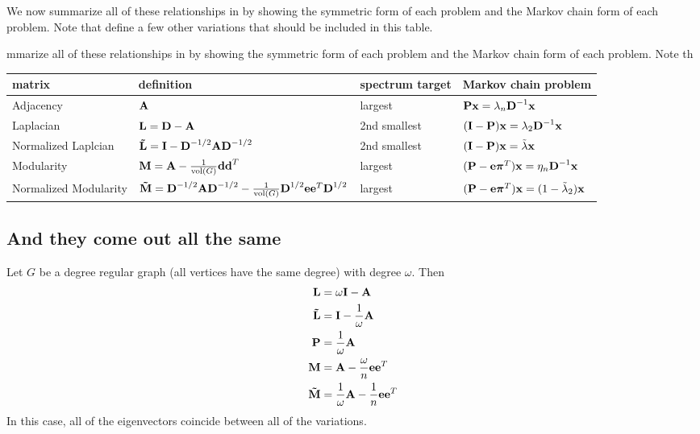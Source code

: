 \documentclass[nofonts]{dgleich-article}
\DeclareMathOperator{\vol}{vol}
\newcommand{\mnL}{\mat{\tilde{L}}}
\newcommand{\mnM}{\mat{\tilde{M}}}
\newcommand{\tlambda}{\tilde{\lambda}}
\newcommand{\meye}{\mI}
\renewcommand{\vpi}{\vec{\pi}}
\begin{document}
We now summarize all of these relationships in by showing the symmetric form
of each problem and the Markov chain form of each problem.  Note that 
\citet{Shi2000-normalized-cuts} define a few other variations that
should be included in this table.  
\begin{fullwidthtable}
\caption{mmarize all of these relationships in by showing the symmetric form
of each problem and the Markov chain form of each problem.  Note th}
 \begin{tabularx}{\linewidth}{XllX}
  \toprule
   matrix & definition & spectrum target & Markov chain problem\\
  \midrule
   Adjacency & $\boldsymbol{\mathrm{A}}$ & largest & $\boldsymbol{\mathrm{P}} \boldsymbol{\mathrm{x}} = \lambda_n \boldsymbol{\mathrm{D}}^{-1} \boldsymbol{\mathrm{x}}$\\[1ex]
   Laplacian & $\boldsymbol{\mathrm{L}} = \boldsymbol{\mathrm{D}} - \boldsymbol{\mathrm{A}}$ & 2nd smallest & $(\boldsymbol{\mathrm{I}} - \boldsymbol{\mathrm{P}}) \boldsymbol{\mathrm{x}} = \lambda_{2} \boldsymbol{\mathrm{D}}^{-1} \boldsymbol{\mathrm{x}}$\\[1ex]
   Normalized Laplcian & $\mnL = \eye - \mD^{-1/2} \mA \mD^{-1/2}$ & 2nd smallest 
     & $(\eye - \mP) \vx = \tlambda \vx$\\[1ex]
   Modularity & $\mM = \mA - \frac{1}{\vol(G)} \vd \vd^T$ & largest 
     & $(\mP - \ve \vpi^T) \vx = \eta_n \mD^{-1} \vx$\\[1ex]
   Normalized Modularity & $\mnM = \mD^{-1/2} \mA \mD^{-1/2} - \frac{1}{\vol(G)} \mD^{1/2} \ve \ve^T \mD^{1/2}$
     & largest & $(\mP - \ve \vpi^T) \vx = (1-\tlambda_2) \vx$\\ 
   \bottomrule
 \end{tabularx}
\end{fullwidthtable}


\subsection{And they come out all the same}

Let $G$ be a degree regular graph (all vertices have
the same degree) with degree $\omega$.  Then 
\[ \begin{aligned}
    \mL & = \omega \meye - \mA \\
    \mnL & = \meye - \frac{1}{\omega} \mA \\
    \mP & = \frac{1}{\omega} \mA \\
    \mM & = \mA - \frac{\omega}{n} \ve \ve^T \\
    \mnM & = \frac{1}{\omega} \mA - \frac{1}{n} \ve \ve^T 
   \end{aligned} \]
In this case, all of the eigenvectors coincide between
all of the variations.  
\end{document}
